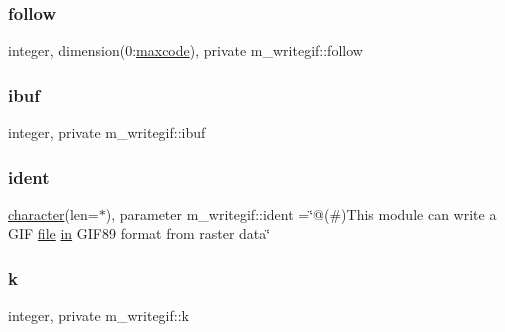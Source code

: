 \mbox{\label{namespacem__writegif_aea2ce887598c0e5d80adb90558230c32}} 
\subsubsection{\texorpdfstring{follow}{follow}}
{\footnotesize\ttfamily integer, dimension(0\+:\hyperlink{namespacem__writegif_ac55f9abf33971ad396b2ae59b288b0bb}{maxcode}), private m\+\_\+writegif\+::follow\hspace{0.3cm}{\ttfamily [private]}}

\mbox{\label{namespacem__writegif_a51ee343cdcbf2cd11f1b3740651077eb}} 
\subsubsection{\texorpdfstring{ibuf}{ibuf}}
{\footnotesize\ttfamily integer, private m\+\_\+writegif\+::ibuf\hspace{0.3cm}{\ttfamily [private]}}

\mbox{\label{namespacem__writegif_af1faf3b881fa6aee6d82b06da4dc3714}} 
\subsubsection{\texorpdfstring{ident}{ident}}
{\footnotesize\ttfamily \hyperlink{option__stopwatch_83_8txt_abd4b21fbbd175834027b5224bfe97e66}{character}(len=$\ast$), parameter m\+\_\+writegif\+::ident =\char`\"{}@(\#)This module can write a G\+IF \hyperlink{what__overview_81_8txt_a447b56c526e8da30e0dc94673727ee25}{file} \hyperlink{M__journal_83_8txt_afce72651d1eed785a2132bee863b2f38}{in} G\+I\+F89 format from raster data\char`\"{}}

\mbox{\label{namespacem__writegif_a29211b5bf371e3be08c3047bc80d3e91}} 
\subsubsection{\texorpdfstring{k}{k}}
{\footnotesize\ttfamily integer, private m\+\_\+writegif\+::k\hspace{0.3cm}{\ttfamily [private]}}

